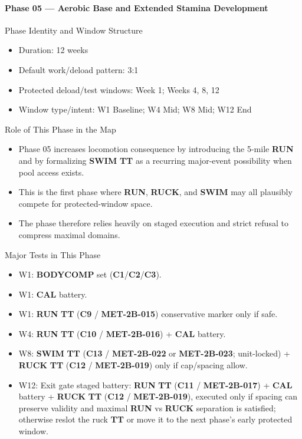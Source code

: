 \documentclass[10pt]{article}
\begin{document}
\newpage
\paragraph*{Phase 05 — Aerobic Base and Extended Stamina Development}

Phase Identity and Window Structure

\begin{itemize}
\item Duration: 12 weeks
\item Default work/deload pattern: 3:1
\item Protected deload/test windows: Week 1; Weeks 4, 8, 12
\item Window type/intent: W1 Baseline; W4 Mid; W8 Mid; W12 End
\end{itemize}

Role of This Phase in the Map

\begin{itemize}
\item Phase 05 increases locomotion consequence by introducing the 5-mile \textbf{RUN} and by formalizing \textbf{SWIM} \textbf{TT} as a recurring major-event possibility when pool access exists.
\item This is the first phase where \textbf{RUN}, \textbf{RUCK}, and \textbf{SWIM} may all plausibly compete for protected-window space.
\item The phase therefore relies heavily on staged execution and strict refusal to compress maximal domains.
\end{itemize}

Major Tests in This Phase

\begin{itemize}
\item W1: \textbf{BODYCOMP} set (\textbf{C1}/\textbf{C2}/\textbf{C3}).
\item W1: \textbf{CAL} battery.
\item W1: \textbf{RUN} \textbf{TT} (\textbf{C9} / \textbf{MET-2B-015}) conservative marker only if safe.
\item W4: \textbf{RUN} \textbf{TT} (\textbf{C10} / \textbf{MET-2B-016}) + \textbf{CAL} battery.
\item W8: \textbf{SWIM} \textbf{TT} (\textbf{C13} / \textbf{MET-2B-022} or \textbf{MET-2B-023}; unit-locked) + \textbf{RUCK} \textbf{TT} (\textbf{C12} / \textbf{MET-2B-019}) only if cap/spacing allow.
\item W12: Exit gate staged battery: \textbf{RUN} \textbf{TT} (\textbf{C11} / \textbf{MET-2B-017}) + \textbf{CAL} battery + \textbf{RUCK} \textbf{TT} (\textbf{C12} / \textbf{MET-2B-019}), executed only if spacing can preserve validity and maximal \textbf{RUN} vs \textbf{RUCK} separation is satisfied; otherwise reslot the ruck \textbf{TT} or move it to the next phase’s early protected window.
\end{itemize}
\end{document}
